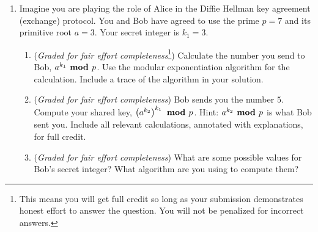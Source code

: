 \begin{enumerate}
\begin{enumerate}
    \end{enumerate}

    \item Imagine you are playing the role of Alice in the Diffie Hellman key agreement (exchange) protocol.  
    You and Bob have agreed to use the prime $p = 7$ and its primitive root $a = 3$.
    Your secret integer is $k_1 = 3$.
        
        \begin{enumerate}
        \item  ({\it Graded for fair effort completeness}\footnote{This means 
        you will get full credit so long as your submission demonstrates honest 
        effort to answer the question. You will not be penalized for incorrect answers.}) 
        Calculate the number you send to Bob, 
        $a^{k_1} \textrm{\bf ~mod~} p$.  Use the modular exponentiation algorithm
        for the calculation. Include a trace of the algorithm in your solution.

        
        
        \item  ({\it Graded for fair effort completeness}) Bob sends you the number $5$. Compute  your shared key, $\left(a^{k_2}\right)^{k_1}  
        \textrm{\bf ~mod~} p$.
        Hint: $a^{k_2} \textrm{\bf ~mod~} p$ is what Bob sent you.  Include all relevant calculations, annotated with explanations, 
        for full credit.
        
        
        \item ({\it Graded for fair effort completeness}) What are some possible values for Bob's secret integer?  What 
        algorithm are you using to compute them?
        \end{enumerate}
    

\end{enumerate}


    
